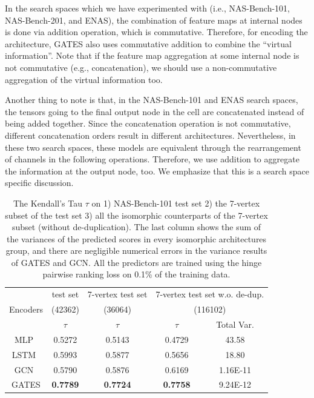 \documentclass[runningheads]{llncs}
\begin{document}
In the search spaces which we have experimented with (i.e., NAS-Bench-101, NAS-Bench-201, and ENAS), the combination of feature maps at internal nodes is done via addition operation, which is commutative. Therefore, for encoding the architecture, GATES also uses commutative addition to combine the ``virtual information''.
Note that if the feature map aggregation at some internal node is not commutative (e.g., concatenation), we should use a non-commutative aggregation of the virtual information too.

Another thing to note is that, in the NAS-Bench-101 and ENAS search spaces, the tensors going to the final output node in the cell are concatenated instead of being added together.
Since the concatenation operation is not commutative, different concatenation orders result in different architectures. Nevertheless, in these two search spaces, these models are equivalent through the rearrangement of channels in the following operations.
Therefore, we use addition to aggregate the information at the output node, too. We emphasize that this is a search space specific discussion.


\begin{table}[tb]
\begin{center}
\caption{The Kendall's Tau $\tau$ on 1) NAS-Bench-101 test set 2) the 7-vertex subset of the test set 3) all the isomorphic counterparts of the 7-vertex subset (without de-duplication). The last column shows the sum of the variances of the predicted scores in every isomorphic architectures group, and there are negligible numerical errors in the variance results of GATES and GCN. All the predictors are trained using the hinge pairwise ranking loss on 0.1\% of the training data.}
\label{table:iso-nb101}
\begin{tabular}{c@{\hskip 0.02\linewidth}cccc}
\toprule
\multirow{3}{*}{Encoders} & test set & 7-vertex test set & \multicolumn{2}{c}{7-vertex test set w.o. de-dup.} \\ 
& (42362) & (36064) & \multicolumn{2}{c}{(116102)} \\\cmidrule(lr){2-2}\cmidrule(lr){3-3}\cmidrule(lr){4-5}
& $\tau$   &$\tau$ & $\tau$  & Total Var.  \\\midrule
MLP~\cite{wang2018alphax}  & 0.5272 & 0.5143 & 0.4729 & 43.58    \\
LSTM~\cite{wang2018alphax} & 0.5993 & 0.5877 & 0.5656 & 18.80    \\
GCN~\cite{shi2019multi}    & 0.5790 & 0.5876 & 0.6169 & 1.16E-11 \\\hline
GATES                      & {\bf 0.7789} & {\bf 0.7724} & {\bf 0.7758} & 9.24E-12 \\ \bottomrule
\end{tabular}
\end{center}
\end{table}
\end{document}
